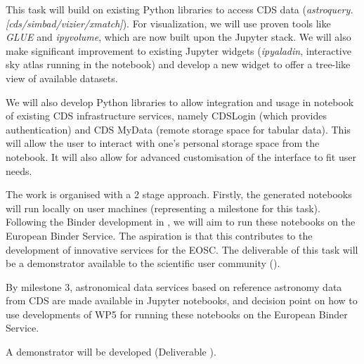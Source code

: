 \begin{task}[
  title=Demonstrator: Astronomy,
  id=astro,
  lead=CDS,
  PM=18,
  wphases={18-42},
  partners={EGI,INSERM,QS,SRL,WTT,XFEL}
]


  This task will build on existing Python libraries to access CDS data
  (\textit{astroquery.[cds/simbad/vizier/xmatch]}). For visualization, we will
  use proven tools like \textit{GLUE} and \textit{ipyvolume}, which are now
  built upon the Jupyter stack.
  We will also make significant improvement to existing Jupyter widgets
  (\textit{ipyaladin}, interactive sky atlas running in the notebook) and
  develop a new widget to offer a tree-like view of available datasets.

  We will also develop Python libraries to allow integration and usage in
  notebook of existing CDS infrastructure services, namely CDSLogin (which
  provides authentication) and CDS MyData (remote storage space for tabular
  data).
  This will allow the user to interact with one's personal storage space from
  the notebook. It will also allow for advanced customisation of the interface
  to fit user needs.

  The work is organised with a 2 stage approach. Firstly, the generated
  notebooks will run locally on user machines (representing a milestone for
  this task). Following the Binder development in , we will aim
  to run these notebooks on the European Binder Service. The aspiration is
  that this contributes to the development of innovative services for the EOSC.
  The deliverable of this task will be a demonstrator available to the
  scientific user community ().

  By milestone 3, astronomical data services based on reference
  astronomy data from CDS are made available in Jupyter notebooks, and
  decision point on how to use developments of WP5 for running these
  notebooks on the European Binder Service.

  A demonstrator will be developed (Deliverable ).


\end{task}

